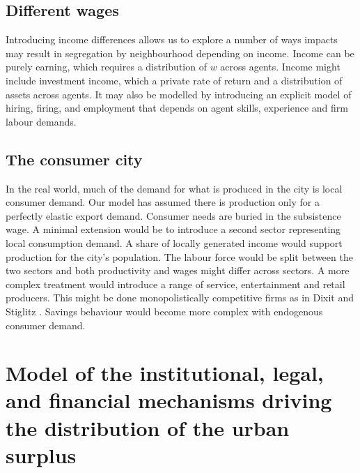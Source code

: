 \subsection{Different wages} 


Introducing income differences %
allows us to explore a number of ways impacts may result in segregation by neighbourhood depending on income. Income can be purely earning, which requires a distribution of $w$ across agents. Income  might include investment income, which  a private rate of return and a distribution of assets across agents. It may also be modelled by introducing an explicit model of hiring, firing, and employment that depends on agent skills, experience and firm labour demands.

\subsection{The consumer city}

In the real world, much of the demand for what is produced in the city is local consumer demand.  Our model has assumed there is production only for a perfectly elastic export demand. Consumer needs are buried in the subsistence wage. A minimal extension would be to introduce a second sector representing local consumption demand. A share of locally generated income would support production for the city's population. The labour force would be split between the two sectors and both productivity and wages might differ across sectors. A more complex treatment would introduce a range of service, entertainment and retail producers. This might be done monopolistically competitive firms as in Dixit and Stiglitz \cite{AvinashK.Dixit1977MCaO}. Savings behaviour would become more complex with endogenous consumer demand. %


\section{Model of the institutional, legal, and financial mechanisms driving the distribution of the urban surplus}

